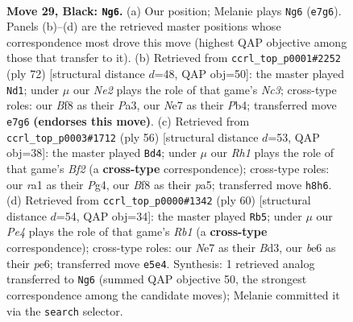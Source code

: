 \documentclass[11pt]{article}
\begin{document}
\clearpage

\begin{figure}[p]\centering
\begin{subfigure}{0.46\textwidth}\centering
\resizebox{\linewidth}{!}{%
\newchessgame
\chessboard[
  setfen={rk3b1r/p3n3/4BP2/2P1p2p/1P5R/8/8/R1B1K3 b Q - 0 29},
  showmover=false,
  pgfstyle=straightmove, color=movearrow, markmove={e7-g6}
]}
\caption{}
\end{subfigure}\hfill
\begin{subfigure}{0.46\textwidth}\centering
\resizebox{\linewidth}{!}{%
\newchessgame
\chessboard[
  setfen={5k2/p4p2/8/8/1Pr4b/P1NRPr2/6R1/6K1 w - - 1 37},
  showmover=false,
  pgfstyle=straightmove, color=movearrow, markmove={c3-d1}
]}
\caption{}
\end{subfigure}
\\[4pt]
\begin{subfigure}{0.46\textwidth}\centering
\resizebox{\linewidth}{!}{%
\newchessgame
\chessboard[
  setfen={7r/5kp1/3R1b1p/p7/5PP1/1r6/1P3B1P/1K4R1 w - - 0 29},
  showmover=false,
  pgfstyle=straightmove, color=movearrow, markmove={f2-d4}
]}
\caption{}
\end{subfigure}\hfill
\begin{subfigure}{0.46\textwidth}\centering
\resizebox{\linewidth}{!}{%
\newchessgame
\chessboard[
  setfen={8/6k1/4p3/r5p1/P2b3r/3B4/R6P/1R5K w - - 0 31},
  showmover=false,
  pgfstyle=straightmove, color=movearrow, markmove={b1-b5}
]}
\caption{}
\end{subfigure}
\caption{\textbf{Move 29, Black: \texttt{Ng6}.} (a) Our position; Melanie plays \texttt{Ng6} (\texttt{e7g6}). Panels (b)--(d) are the retrieved master positions whose correspondence most drove this move (highest QAP objective among those that transfer to it). (b) Retrieved from \texttt{ccrl\_top\_p0001\#2252} (ply 72) [structural distance $d$=48, QAP obj=50]: the master played \texttt{Nd1}; under $\mu$ our \emph{Ne2} plays the role of that game's \emph{Nc3}; cross-type roles: our \emph{B}f8 as their \emph{P}a3, our \emph{N}e7 as their \emph{P}b4; transferred move \texttt{e7g6} \textbf{(endorses this move)}. (c) Retrieved from \texttt{ccrl\_top\_p0003\#1712} (ply 56) [structural distance $d$=53, QAP obj=38]: the master played \texttt{Bd4}; under $\mu$ our \emph{Rh1} plays the role of that game's \emph{Bf2} (a \textbf{cross-type} correspondence); cross-type roles: our \emph{r}a1 as their \emph{P}g4, our \emph{B}f8 as their \emph{p}a5; transferred move \texttt{h8h6}. (d) Retrieved from \texttt{ccrl\_top\_p0000\#1342} (ply 60) [structural distance $d$=54, QAP obj=34]: the master played \texttt{Rb5}; under $\mu$ our \emph{Pe4} plays the role of that game's \emph{Rb1} (a \textbf{cross-type} correspondence); cross-type roles: our \emph{N}e7 as their \emph{B}d3, our \emph{b}e6 as their \emph{p}e6; transferred move \texttt{e5e4}. Synthesis: 1 retrieved analog transferred to \texttt{Ng6} (summed QAP objective 50, the strongest correspondence among the candidate moves); Melanie committed it via the \texttt{search} selector.}
\label{fig:thought-m57}
\end{figure}
\end{document}
